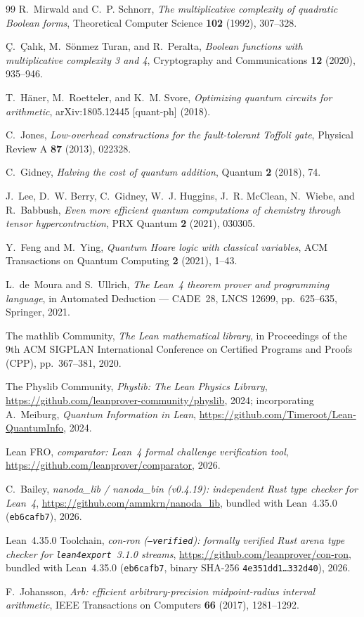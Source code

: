 \documentclass[11pt,a4paper]{article}
\theoremstyle{definition}
\theoremstyle{remark}
\begin{document}
\begin{thebibliography}{99}
R.~Mirwald and C.~P. Schnorr,
\emph{The multiplicative complexity of quadratic Boolean forms},
Theoretical Computer Science \textbf{102} (1992), 307--328.

\c{C}.~\c{C}al\i k, M.~S\"onmez Turan, and R.~Peralta,
\emph{Boolean functions with multiplicative complexity 3 and 4},
Cryptography and Communications \textbf{12} (2020), 935--946.

T.~H\"aner, M.~Roetteler, and K.~M. Svore,
\emph{Optimizing quantum circuits for arithmetic},
arXiv:1805.12445 [quant-ph] (2018).

C.~Jones,
\emph{Low-overhead constructions for the fault-tolerant Toffoli gate},
Physical Review A \textbf{87} (2013), 022328.

C.~Gidney,
\emph{Halving the cost of quantum addition},
Quantum \textbf{2} (2018), 74.

J.~Lee, D.~W. Berry, C.~Gidney, W.~J. Huggins, J.~R. McClean, N.~Wiebe, and R.~Babbush,
\emph{Even more efficient quantum computations of chemistry through tensor hypercontraction},
PRX Quantum \textbf{2} (2021), 030305.

Y.~Feng and M.~Ying,
\emph{Quantum Hoare logic with classical variables},
ACM Transactions on Quantum Computing \textbf{2} (2021), 1--43.

L.~de~Moura and S.~Ullrich,
\emph{The Lean~4 theorem prover and programming language},
in Automated Deduction --- CADE~28, LNCS 12699, pp.~625--635, Springer, 2021.

The mathlib Community,
\emph{The Lean mathematical library},
in Proceedings of the 9th ACM SIGPLAN International Conference on Certified Programs and Proofs (CPP), pp.~367--381, 2020.

The Physlib Community,
\emph{Physlib: The Lean Physics Library},
\url{https://github.com/leanprover-community/physlib}, 2024;
incorporating A.~Meiburg, \emph{Quantum Information in Lean},
\url{https://github.com/Timeroot/Lean-QuantumInfo}, 2024.

Lean FRO,
\emph{comparator: Lean~4 formal challenge verification tool},
\url{https://github.com/leanprover/comparator}, 2026.

C.~Bailey,
\emph{nanoda\_lib / nanoda\_bin (v0.4.19): independent Rust type checker for Lean~4},
\url{https://github.com/ammkrn/nanoda_lib}, bundled with Lean~4.35.0 (\texttt{eb6cafb7}), 2026.

Lean~4.35.0 Toolchain,
\emph{con-ron (\texttt{--verified}): formally verified Rust arena type checker for \texttt{lean4export}~3.1.0 streams},
\url{https://github.com/leanprover/con-ron}, bundled with Lean~4.35.0 (\texttt{eb6cafb7}, binary SHA-256 \texttt{4e351dd1\ldots 332d40}), 2026.

F.~Johansson,
\emph{Arb: efficient arbitrary-precision midpoint-radius interval arithmetic},
IEEE Transactions on Computers \textbf{66} (2017), 1281--1292.

\end{thebibliography}
\end{document}
